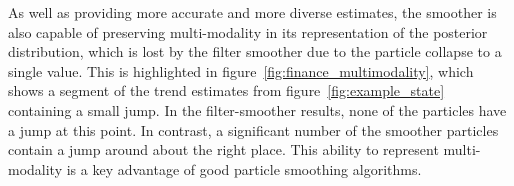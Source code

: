 \documentclass[10pt,twocolumn,twoside]{IEEEtran}
\begin{document}
%
%
%
%
As well as providing more accurate and more diverse estimates, the smoother is also capable of preserving multi-modality in its representation of the posterior distribution, which is lost by the filter smoother due to the particle collapse to a single value. This is highlighted in figure~\ref{fig:finance_multimodality}, which shows a segment of the trend estimates from figure~\ref{fig:example_state} containing a small jump. In the filter-smoother results, none of the particles have a jump at this point. In contrast, a significant number of the smoother particles contain a jump around about the right place. This ability to represent multi-modality is a key advantage of good particle smoothing algorithms.
%
\end{document}
